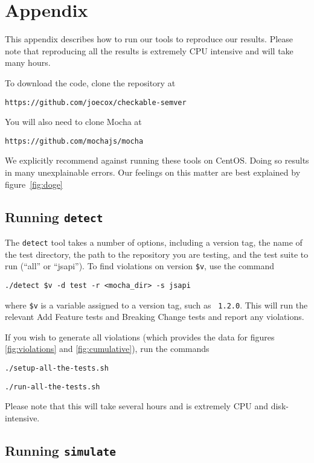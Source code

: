 \section{Appendix}
This appendix describes how to run our tools to reproduce our
results. Please note that reproducing all the results is extremely CPU
intensive and will take many hours.

To download the code, clone the repository at
\begin{center}
  {\tt https://github.com/joecox/checkable-semver}
\end{center}

You will also need to clone Mocha at
\begin{center}
  {\tt https://github.com/mochajs/mocha}
\end{center}

We explicitly recommend against running these tools on CentOS. Doing so
results in many unexplainable errors. Our feelings on this matter are
best explained by figure~\ref{fig:doge}

\subsection{Running {\large {\tt detect}}}

The {\tt detect} tool takes a number of options, including a version
tag, the name of the test directory, the path to the repository you
are testing, and the test suite to run (``all'' or ``jsapi''). To find
violations on version {\tt \$v}, use the command

\begin{center}
  {\tt ./detect \$v -d test -r <mocha\_dir> -s jsapi}
\end{center}
where {\tt \$v} is a variable assigned to a version tag, such as {\tt
  1.2.0}. This will run the relevant Add Feature tests and Breaking
Change tests and report any violations.

If you wish to generate all violations (which provides the data for
figures \ref{fig:violations} and \ref{fig:cumulative}), run the
commands

\begin{center}
  {\tt ./setup-all-the-tests.sh}
\end{center}
\begin{center}
  {\tt ./run-all-the-tests.sh}
\end{center}
Please note that this will take several hours and is extremely CPU
and disk-intensive.

\subsection{Running {\large {\tt simulate}}}

